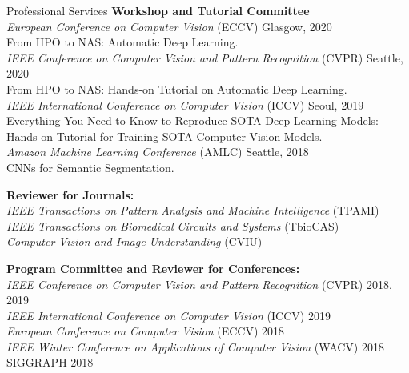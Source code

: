 \documentclass{resume} %
\begin{document}
\begin{rSection}{Professional Services}
{\bf Workshop and Tutorial Committee} \\
{\it European Conference on Computer Vision} (ECCV) \hfill{Glasgow, 2020}\\
From HPO to NAS: Automatic Deep Learning. \\

{\it IEEE Conference on Computer Vision and Pattern Recognition} (CVPR) \hfill{Seattle, 2020}\\
From HPO to NAS: Hands-on Tutorial on Automatic Deep Learning. \\

{\it IEEE International Conference on Computer Vision} (ICCV) \hfill{Seoul, 2019}\\
Everything You Need to Know to Reproduce SOTA Deep Learning Models: \\
Hands-on Tutorial for Training SOTA Computer Vision Models. \\

{\it Amazon Machine Learning Conference} (AMLC) \hfill{Seattle, 2018}\\
CNNs for Semantic Segmentation. 

{\bf Reviewer for Journals:} \\
{\it IEEE Transactions on Pattern Analysis and Machine Intelligence} (TPAMI) \\
{\it IEEE Transactions on Biomedical Circuits and Systems} (TbioCAS) \\
{\it Computer Vision and Image Understanding} (CVIU)

{\bf Program Committee and Reviewer for Conferences:} \\
{\it IEEE Conference on Computer Vision and Pattern Recognition} (CVPR) \hfill{2018, 2019}\\
{\it IEEE International Conference on Computer Vision} (ICCV)  \hfill{2019}\\
{\it European Conference on Computer Vision} (ECCV) \hfill{2018}\\
{\it IEEE Winter Conference on Applications of Computer Vision} (WACV)  \hfill{2018}\\
SIGGRAPH  \hfill{2018}


\end{rSection}
\end{document}
